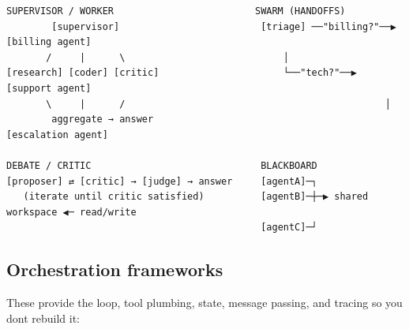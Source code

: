 \documentclass[11pt]{article}
\begin{document}
\setcodelang{}

\begin{verbatim}
SUPERVISOR / WORKER                         SWARM (HANDOFFS)
        [supervisor]                         [triage] ──"billing?"──▶ [billing agent]
       /     |      \                            │
[research] [coder] [critic]                      └──"tech?"──▶ [support agent]
       \     |      /                                              │
        aggregate → answer                                    [escalation agent]

DEBATE / CRITIC                              BLACKBOARD
[proposer] ⇄ [critic] → [judge] → answer     [agentA]─┐
   (iterate until critic satisfied)          [agentB]─┼─▶ shared workspace ◀─ read/write
                                             [agentC]─┘
\end{verbatim}

\subsection{Orchestration frameworks}\label{orchestration-frameworks}

These provide the loop, tool plumbing, state, message passing, and tracing so you don\textquotesingle t rebuild it:
\end{document}
